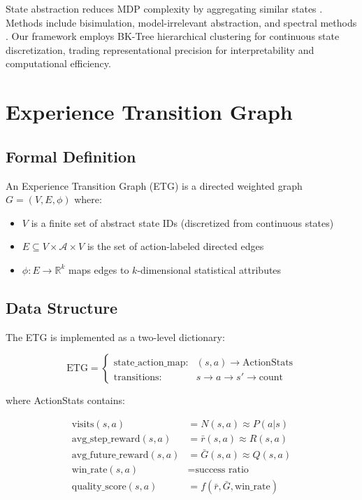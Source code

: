 \documentclass[letterpaper]{article}
\begin{document}
State abstraction reduces MDP complexity by aggregating similar states \cite{abel2018abstraction}. Methods include bisimulation, model-irrelevant abstraction, and spectral methods \cite{starre2022survey}. Our framework employs BK-Tree hierarchical clustering for continuous state discretization, trading representational precision for interpretability and computational efficiency.

\section{Experience Transition Graph}

\subsection{Formal Definition}

An Experience Transition Graph (ETG) is a directed weighted graph $G = (V, E, \phi)$ where:

\begin{itemize}
    \item $V$ is a finite set of abstract state IDs (discretized from continuous states)
    \item $E \subseteq V \times \mathcal{A} \times V$ is the set of action-labeled directed edges
    \item $\phi: E \rightarrow \mathbb{R}^k$ maps edges to $k$-dimensional statistical attributes
\end{itemize}

\subsection{Data Structure}

The ETG is implemented as a two-level dictionary:

\begin{equation}
\text{ETG} = \begin{cases}
\text{state\_action\_map}: & (s, a) \rightarrow \text{ActionStats} \\
\text{transitions}: & s \rightarrow a \rightarrow s' \rightarrow \text{count}
\end{cases}
\end{equation}

where ActionStats contains:

\begin{align}
\text{visits}(s,a) &= N(s,a) \approx P(a|s) \\
\text{avg\_step\_reward}(s,a) &= \bar{r}(s,a) \approx R(s,a) \\
\text{avg\_future\_reward}(s,a) &= \bar{G}(s,a) \approx Q(s,a) \\
\text{win\_rate}(s,a) &= \text{success ratio} \\
\text{quality\_score}(s,a) &= f(\bar{r}, \bar{G}, \text{win\_rate})
\end{align}
\end{document}
